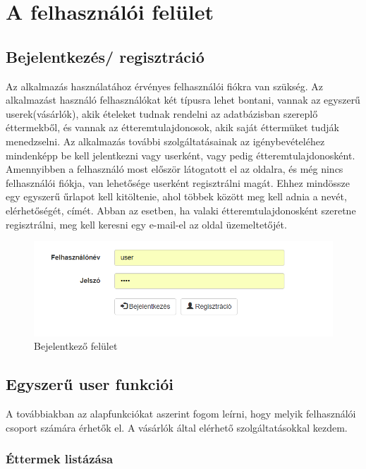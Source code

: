 \chapter{A felhasználói felület}

\section{Bejelentkezés/ regisztráció}

Az alkalmazás használatához érvényes felhasználói fiókra van szükség. Az alkalmazást használó felhasználókat két típusra lehet bontani, vannak az egyszerű userek(vásárlók), akik ételeket tudnak rendelni az adatbázisban szereplő éttermekből, és vannak az étteremtulajdonosok, akik saját éttermüket tudják menedzselni. Az alkalmazás további szolgáltatásainak az igénybevételéhez mindenképp be kell jelentkezni vagy userként, vagy pedig étteremtulajdonosként. Amennyibben a felhasználó most először látogatott el az oldalra, és még nincs felhasználói fiókja, van lehetősége userként regisztrálni magát. Ehhez mindössze egy egyszerű űrlapot kell kitöltenie, ahol többek között meg kell adnia a nevét, elérhetőségét, címét. Abban az esetben, ha valaki étteremtulajdonosként szeretne regisztrálni, meg kell keresni egy e-mail-el az oldal üzemeltetőjét.

\begin{figure}
\centering
\includegraphics[scale=0.8]{kepek/login.png}
\caption{Bejelentkező felület}
\label{fig:architecture}
\end{figure}

\section{Egyszerű user funkciói}

A továbbiakban az alapfunkciókat aszerint fogom leírni, hogy melyik felhasználói csoport számára érhetők el. A vásárlók által elérhető szolgáltatásokkal kezdem.

\subsection{Éttermek listázása}

